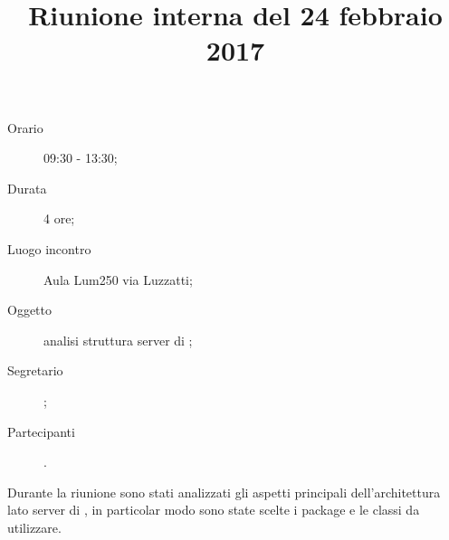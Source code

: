 


\author{\LS}
\title{Riunione interna del 24 febbraio 2017}



\maketitle

\begin{description}
	\item[Orario] 09:30 - 13:30;
	\item[Durata] 4 ore;
	\item[Luogo incontro] Aula Lum250 via Luzzatti;
	\item[Oggetto] analisi struttura server di \proj{};
	\item[Segretario] \LS; 
	\item[Partecipanti] \ALL.
\end{description}
Durante la riunione sono stati analizzati gli aspetti principali dell'architettura lato server di \proj{}, in particolar modo sono state scelte i package e le classi da utilizzare.

